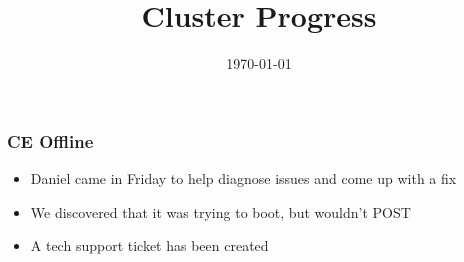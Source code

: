 \documentclass{beamer}
\title{Cluster Progress}
\date{\today}
\begin{document}

\begin{frame}
  \maketitle
\end{frame}


\begin{frame}
  \frametitle{CE Offline}

  \begin{itemize}
  \item Daniel came in Friday to help diagnose issues and come up with a fix
  \item We discovered that it was trying to boot, but wouldn't POST
  \item A tech support ticket has been created
  \end{itemize}
\end{frame}

\end{document}
